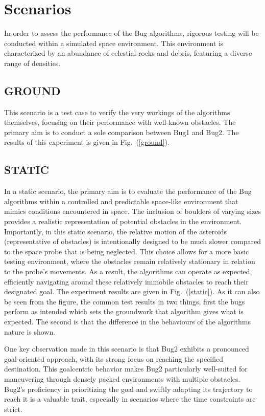 \documentclass{IEEEtaes}
\begin{document}
\section{\large \textbf{Scenarios}}
In order to assess the performance of the Bug algorithms, rigorous testing will be conducted within a simulated space environment. This environment is characterized by an abundance of celestial rocks and debris, featuring a diverse range of densities.


\subsection{\fontsize{10}{13}\selectfont GROUND}
This scenario is a test case to verify the very workings of the algorithms themselves, focusing on their performance with well-known obstacles. The primary aim is to conduct a sole comparison between Bug1 and Bug2. The results of this experiment is given in Fig.~(\ref{ground}).


\subsection{\fontsize{10}{13}\selectfont STATIC}

In a static scenario, the primary aim is to evaluate the performance of the Bug algorithms within a controlled  and predictable space-like environment that mimics conditions encountered in space. The inclusion of boulders of varying sizes provides a realistic representation of potential obstacles in the environment. Importantly, in this static scenario, the relative motion of the asteroids (representative of obstacles) is intentionally designed to be much slower compared to the space probe that is being neglected. This choice allows for a more basic testing environment, where the obstacles remain relatively stationary in relation to the probe's movements. As a result, the algorithms can operate as expected, efficiently navigating around these relatively immobile obstacles to reach their designated goal. The experiment results are given in Fig.~(\ref{static}). As it can also be seen from the figure, the common test results in two things, first the bugs perform as intended which sets the groundwork that algorithm gives what is expected. The second is that the difference in the behaviours of the algorithms nature is shown.

One key observation made in this scenario is that Bug2 exhibits a pronounced goal-oriented approach, with its strong focus on reaching the specified destination. This goalcentric behavior makes Bug2 particularly well-suited for maneuvering through densely packed environments with multiple obstacles. Bug2's proficiency in prioritizing the goal and swiftly adapting its trajectory to reach it is a valuable trait, especially in scenarios where the time constraints are strict.
\end{document}
